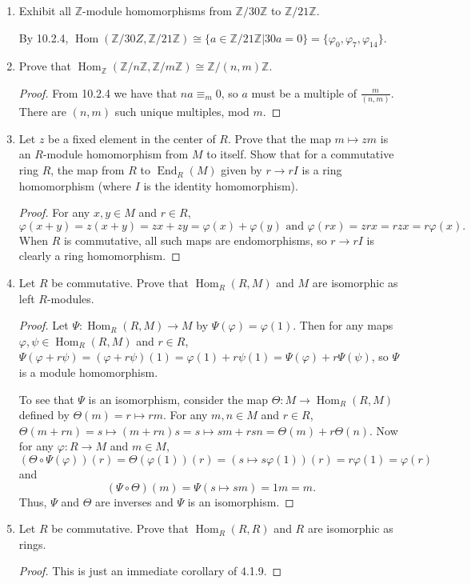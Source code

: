 \documentclass{report}
\newcommand{\Z}{\mathbb{Z}}
\DeclareMathOperator{\Hom}{Hom}
\DeclareMathOperator{\End}{End}
\begin{document}
\begin{enumerate}
	\item Exhibit all $\Z$-module homomorphisms from $\Z /30\Z$ to $\Z /21\Z$. 
		\newline

		By 10.2.4, $\Hom(\Z /30Z,\Z /21\Z)\cong \{a\in\Z /21\Z|30a=0\}=\{\varphi_0,\varphi_7,\varphi_{14}\}$.
	\item Prove that $\Hom_\Z(\Z /n\Z,\Z /m\Z)\cong \Z /(n,m)\Z$.
		\begin{proof}
			From 10.2.4 we have that $na\equiv_m 0$, so $a$ must be a multiple of $\frac{m}{(n,m)}$. There are $(n,m)$ such unique multiples, mod $m$.
		\end{proof}
	\item Let $z$ be a fixed element in the center of $R$. Prove that the map $m\mapsto zm$ is an $R$-module homomorphism from $M$ to itself. 
		Show that for a commutative ring $R$, the map from $R$ to $\End_R(M)$ given by $r\to rI$ is a ring homomorphism (where $I$ is the identity homomorphism).
		\begin{proof}
			For any $x,y\in M$ and $r\in R$, 
			$$\varphi(x+y)=z(x+y)=zx+zy=\varphi(x)+\varphi(y) \text{ and } \varphi(rx)=zrx=rzx=r\varphi(x).$$
			When $R$ is commutative, all such maps are endomorphisms, so $r\to rI$ is clearly a ring homomorphism. 
		\end{proof}
		
		\setcounter{enumi}{8}
	\item Let $R$ be commutative. Prove that $\Hom_R(R,M)$ and $M$ are isomorphic as left $R$-modules. 
		\begin{proof}
			Let $\Psi:\Hom_R(R,M)\to M$ by $\Psi(\varphi)=\varphi(1)$. Then for any maps $\varphi,\psi\in\Hom_R(R,M)$ and $r\in R$,
			$\Psi(\varphi+r\psi)=(\varphi+r\psi)(1)=\varphi(1)+r\psi(1)=\Psi(\varphi)+r\Psi(\psi)$, so $\Psi$ is a module homomorphism.
			\newline

			To see that $\Psi$ is an isomorphism, consider the map $\Theta:M\to \Hom_R(R,M)$ defined by $\Theta(m)=r\mapsto rm$.
			For any $m,n \in M$ and $r\in R$, $\Theta(m+rn)=s\mapsto(m+rn)s=s\mapsto sm+rsn=\Theta(m)+r\Theta(n)$.
			Now for any $\varphi:R\to M$ and $m\in M$, 
			$$(\Theta\circ\Psi(\varphi))(r)=\Theta(\varphi(1))(r)=(s\mapsto s\varphi(1))(r)=r\varphi(1)=\varphi(r)$$
			and
			$$(\Psi \circ \Theta)(m)=\Psi(s\mapsto sm)=1m=m.$$
			Thus, $\Psi$ and $\Theta$ are inverses and $\Psi$ is an isomorphism.
		\end{proof}
	\item Let $R$ be commutative. Prove that $\Hom_R(R,R)$ and $R$ are isomorphic as rings.
		\begin{proof}
			This is just an immediate corollary of 4.1.9.
		\end{proof}
		

\end{enumerate}
\end{document}
